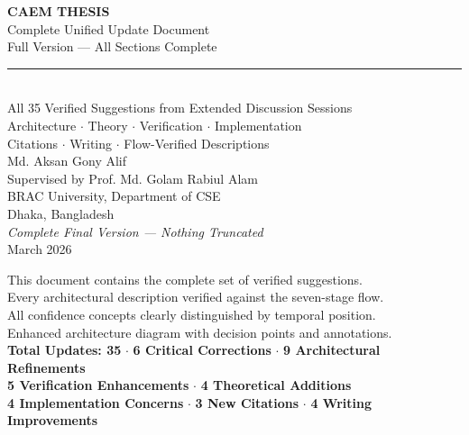 \documentclass[11pt,a4paper]{article}
\begin{document}

\pagecolor{NavyBlue}
\color{white}
\begin{titlepage}
\vspace*{2.5cm}
\begin{center}
{\fontsize{32}{40}\selectfont\bfseries\color{white}CAEM THESIS}\\[0.4em]
{\fontsize{20}{28}\selectfont\color{white!90}
  Complete Unified Update Document}\\[0.5em]
{\fontsize{14}{18}\selectfont\color{white!75}
  Full Version — All Sections Complete}\\[2em]
{\color{white!35}\rule{0.6\linewidth}{0.8pt}}\\[2em]
{\large\color{white!85}
  All 35 Verified Suggestions from Extended Discussion Sessions\\[0.4em]
  Architecture $\cdot$ Theory $\cdot$ Verification $\cdot$ Implementation\\[0.4em]
  Citations $\cdot$ Writing $\cdot$ Flow-Verified Descriptions
}\\[3.5em]
{\normalsize\color{white!70}
  Md. Aksan Gony Alif\\[0.3em]
  Supervised by Prof. Md. Golam Rabiul Alam\\[0.3em]
  BRAC University, Department of CSE\\[0.3em]
  Dhaka, Bangladesh\\[1.5em]
  \emph{Complete Final Version — Nothing Truncated}\\
  March 2026
}
\end{center}
\vfill
\begin{center}
{\small\color{white!40}
  This document contains the complete set of verified suggestions.\\
  Every architectural description verified against the seven-stage flow.\\
  All confidence concepts clearly distinguished by temporal position.\\
  Enhanced architecture diagram with decision points and annotations.\\[0.5em]
  \textbf{Total Updates: 35} $\cdot$ \textbf{6 Critical Corrections} $\cdot$ \textbf{9 Architectural Refinements}\\
  \textbf{5 Verification Enhancements} $\cdot$ \textbf{4 Theoretical Additions}\\
  \textbf{4 Implementation Concerns} $\cdot$ \textbf{3 New Citations} $\cdot$ \textbf{4 Writing Improvements}
}
\end{center}
\end{titlepage}
\pagecolor{white}\color{black}
\end{document}
